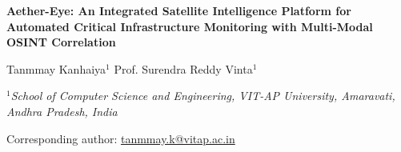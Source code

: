 \documentclass[11pt,a4paper]{article}
\begin{document}
\begin{titlepage}
\begin{center}
\vspace*{1.2cm}
 
{\sffamily\bfseries\LARGE Aether-Eye: An Integrated Satellite Intelligence Platform for Automated Critical Infrastructure Monitoring with Multi-Modal OSINT Correlation\par}
 
\vspace{1.4cm}
 
{\normalsize Tanmmay Kanhaiya$^{1}$ \quad Prof. Surendra Reddy Vinta$^{1}$\par}
\vspace{0.4cm}
{\itshape\small $^{1}$School of Computer Science and Engineering, VIT-AP University, Amaravati, Andhra Pradesh, India\par}
 
\vspace{0.5cm}
{\small Corresponding author: \href{mailto:tanmmay.k@vitap.ac.in}{tanmmay.k@vitap.ac.in}\par}

\vspace{1.6cm}


\end{center}
\end{titlepage}
\end{document}
